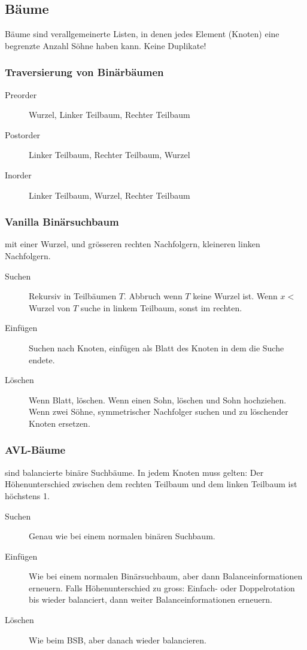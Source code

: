 \documentclass[a4paper, 9pt, DIV=20]{scrartcl}
\begin{document}
\subsection{Bäume}
Bäume sind verallgemeinerte Listen, in denen jedes Element (Knoten) eine begrenzte Anzahl Söhne haben kann. Keine Duplikate! 

\subsubsection{Traversierung von Binärbäumen}
\begin{description}
\item[Preorder] Wurzel, Linker Teilbaum, Rechter Teilbaum
\item[Postorder] Linker Teilbaum, Rechter Teilbaum, Wurzel
\item[Inorder] Linker Teilbaum, Wurzel, Rechter Teilbaum
\end{description}

\subsubsection{Vanilla Binärsuchbaum} mit einer Wurzel, und grösseren rechten Nachfolgern, kleineren linken Nachfolgern.
\begin{description}
\item[Suchen] Rekursiv in Teilbäumen $T$. Abbruch wenn $T$ keine Wurzel ist. Wenn $x <$ Wurzel von $T$ suche in linkem Teilbaum, sonst im rechten.
\item[Einfügen] Suchen nach Knoten, einfügen als Blatt des Knoten in dem die Suche endete.
\item[Löschen] Wenn Blatt, löschen. Wenn einen Sohn, löschen und Sohn hochziehen. Wenn zwei Söhne, symmetrischer Nachfolger suchen und zu löschender Knoten ersetzen.
\end{description}

\subsubsection{AVL-Bäume} sind balancierte binäre Suchbäume. In jedem Knoten muss gelten: Der Höhenunterschied zwischen dem rechten Teilbaum und dem linken Teilbaum ist höchstens 1.
\begin{description}
\item[Suchen] Genau wie bei einem normalen binären Suchbaum.
\item[Einfügen] Wie bei einem normalen Binärsuchbaum, aber dann Balanceinformationen erneuern. Falls Höhenunterschied zu gross: Einfach- oder Doppelrotation bis wieder balanciert, dann weiter Balanceinformationen erneuern.
\item[Löschen] Wie beim BSB, aber danach wieder balancieren.
\end{description}
\end{document}
